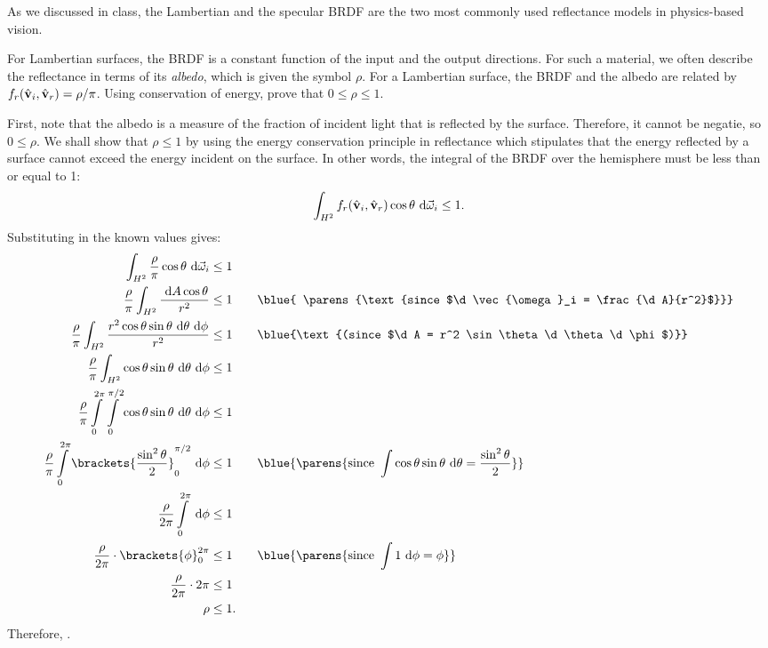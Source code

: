 \begin{problem}
  As we discussed in class, the Lambertian and the specular BRDF are the
  two most commonly used reflectance models in physics-based vision.
  \begin{enumroman}
    \item For Lambertian surfaces, the BRDF is a constant function of the input
      and the output directions. For such a material, we often describe the
      reflectance in terms of its \emph{albedo}, which is given the symbol $\rho$.
      For a Lambertian surface, the BRDF and the albedo are related by
      $f_r(\hat{\mathbf{v}}_i, \hat{\mathbf{v}}_r) = \rho/\pi$.
      Using conservation of energy, prove that $0 \leq \rho \leq 1$.
      \begin{answer}
        First, note that the albedo is a measure of the fraction of incident
        light that is reflected by the surface. Therefore,
        it cannot be negatie, so $0 \leq \rho$.
        We shall show that $\rho \leq 1$ by using the energy conservation
        principle in reflectance which stipulates that
        the energy reflected by a surface cannot exceed the energy incident
        on the surface. In other words, the integral of the BRDF over the
        hemisphere must be less than or equal to 1:
        \[
          \int_{H^2} f_r(\hat{\mathbf{v}}_i, \hat{\mathbf{v}}_r) \cos \theta \text{ d}\vec{\omega}_i \leq 1.
        \]
        Substituting in the known values gives:
        \begin{align*}
          \int_{H^2} \frac{\rho}{\pi} \cos \theta \d\vec{\omega}_i &\leq 1 \\
          \frac{\rho}{\pi} \int_{H^2} \frac{\d A \cos\theta }{r^2} &\leq 1
          \qquad\blue{ \parens{\text{since $\d \vec{\omega}_i = \frac{\d A}{r^2}$}}} \\
          \frac{\rho}{\pi} \int_{H^2} \frac{r^2 \cos\theta \sin \theta \d \theta \d \phi}{r^2} &\leq 1
          \qquad\blue{\text{(since $\d A = r^2 \sin \theta \d \theta \d \phi$)}}\\
          \frac{\rho}{\pi} \int_{H^2} \cos\theta \sin \theta \d \theta \d \phi &\leq 1 \\
          \frac{\rho}{\pi} \int\limits_{0}^{2\pi} \int\limits_{0}^{\pi/2} \cos\theta \sin \theta \d \theta \d \phi &\leq 1 \\
          \frac{\rho}{\pi} \int\limits_{0}^{2\pi} \brackets{\frac{\sin^2\theta}{2} }_0^{\pi/2} \d \phi &\leq 1
          \qquad\blue{\parens{\text{since }\int \cos\theta \sin\theta \d \theta = \frac{\sin^2\theta}{2}}} \\
          \frac{\rho}{2\pi} \int\limits_{0}^{2\pi} \d \phi &\leq 1 \\
          \frac{\rho}{2\pi} \cdot \brackets{\phi}_0^{2 \pi} &\leq 1
          \qquad\blue{\parens{\text{since }\int 1 \d \phi = \phi}} \\
          \frac{\rho}{2\pi} \cdot 2\pi &\leq 1 \\
          \rho &\leq 1.
        \end{align*}
        Therefore, .
      \end{answer}


\end{enumroman}
\end{problem}
